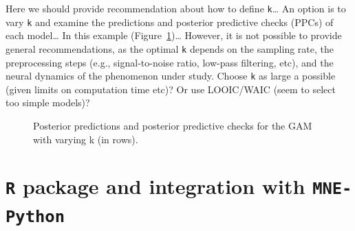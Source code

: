 \documentclass[
  doc,
  floatsintext,
  longtable,
  a4paper,
  nolmodern,
  notxfonts,
  notimes,
  donotrepeattitle,
  colorlinks=true,linkcolor=blue,citecolor=blue,urlcolor=blue]{apa7}
\begin{document}
Here we should provide recommendation about how to define
\texttt{k}\ldots{} An option is to vary \texttt{k} and examine the
predictions and posterior predictive checks (PPCs) of each model\ldots{}
In this example (Figure~\ref{fig-choose-k})\ldots{} However, it is not
possible to provide general recommendations, as the optimal \texttt{k}
depends on the sampling rate, the preprocessing steps (e.g.,
signal-to-noise ratio, low-pass filtering, etc), and the neural dynamics
of the phenomenon under study. Choose \texttt{k} as large a possible
(given limits on computation time etc)? Or use LOOIC/WAIC (seem to
select too simple models)?

\begin{figure}[!htb]

\caption{\label{fig-choose-k}Posterior predictions and posterior
predictive checks for the GAM with varying k (in rows).}


\end{figure}%

\newpage

\section{\texorpdfstring{\texttt{R} package and integration with
\texttt{MNE-Python}}{R package and integration with MNE-Python}}\label{r-package-and-integration-with-mne-python}
\end{document}
